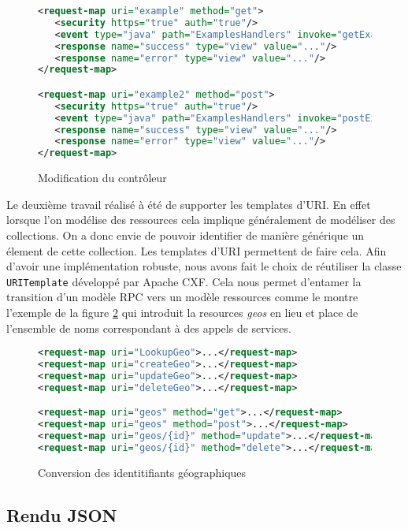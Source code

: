\documentclass[a4paper, 11pt]{report}
\begin{document}
\begin{figure}
  \begin{lstlisting}[language=xml]
<request-map uri="example" method="get">
   <security https="true" auth="true"/>
   <event type="java" path="ExamplesHandlers" invoke="getExamples"/>
   <response name="success" type="view" value="..."/>
   <response name="error" type="view" value="..."/>
</request-map>

<request-map uri="example2" method="post">
   <security https="true" auth="true"/>
   <event type="java" path="ExamplesHandlers" invoke="postExamples"/>
   <response name="success" type="view" value="..."/>
   <response name="error" type="view" value="..."/>
</request-map>
  \end{lstlisting}
  \caption{Modification du contrôleur}
  \label{fig:controlmodif}
\end{figure}

Le deuxième travail réalisé à été de supporter les templates d'URI.
En effet lorsque l'on modélise des ressources cela implique
généralement de modéliser des collections. On a donc envie de pouvoir
identifier de manière générique un élement de cette collection. Les
templates d'URI permettent de faire cela. Afin d'avoir une
implémentation robuste, nous avons fait le choix de réutiliser la
classe \verb=URITemplate= développé par Apache CXF. Cela nous permet
d'entamer la transition d'un modèle RPC vers un modèle ressources
comme le montre l'exemple de la figure \ref{fig:urit} qui introduit la
resources \emph{geos} en lieu et place de l'ensemble de noms
correspondant à des appels de services.

\begin{figure}
  \begin{lstlisting}[language=xml]
<request-map uri="LookupGeo">...</request-map>
<request-map uri="createGeo">...</request-map>
<request-map uri="updateGeo">...</request-map>
<request-map uri="deleteGeo">...</request-map>

<request-map uri="geos" method="get">...</request-map>
<request-map uri="geos" method="post">...</request-map>
<request-map uri="geos/{id}" method="update">...</request-map>
<request-map uri="geos/{id}" method="delete">...</request-map>
  \end{lstlisting}
\caption{Conversion des identitifiants géographiques}
\label{fig:urit}
\end{figure}

\subsection{Rendu JSON}
\end{document}
